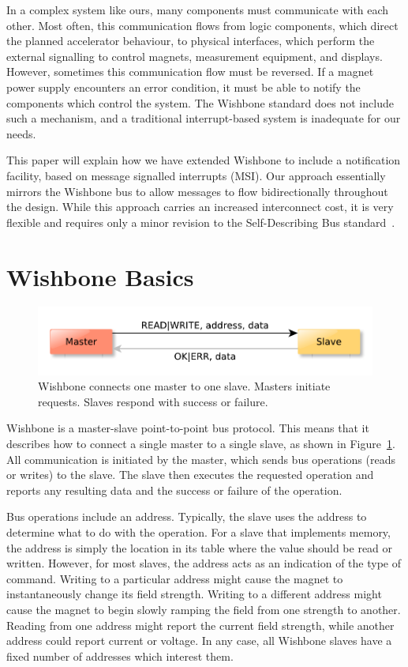 \documentclass[a4paper]{jacow}
\begin{document}
In a complex system like ours, many components must communicate with each other.
Most often, this communication flows from logic components, which direct the
planned accelerator behaviour, to physical interfaces, which perform the
external signalling to control magnets, measurement equipment, and displays.
However, sometimes this communication flow must be reversed.
If a magnet power supply encounters an error condition, 
it must be able to notify the components which control the system.
The Wishbone standard does not include such a mechanism,
and a traditional interrupt-based system is inadequate for our needs.

This paper will explain how we have extended Wishbone to include a
notification facility, based on message signalled interrupts (MSI).
Our approach essentially mirrors the Wishbone bus to allow messages to flow
bidirectionally throughout the design.
While this approach carries an increased interconnect cost, 
it is very flexible and requires only a minor revision to the
Self-Describing Bus standard~\cite{sdb}.

\section{Wishbone Basics}

\begin{figure}[t]
  \centering
  \includegraphics*[width=\columnwidth]{wb-ptp}
  \caption{Wishbone connects one master to one slave. 
  Masters initiate requests. Slaves respond with
  success or failure.}
  \label{fig:wb-ptp}
\end{figure}

Wishbone is a master-slave point-to-point bus protocol.
This means that it describes how to connect a single master to a single slave,
as shown in Figure~\ref{fig:wb-ptp}.
All communication is initiated by the master,
which sends bus operations (reads or writes) to the slave.
The slave then executes the requested operation and reports any resulting
data and the success or failure of the operation.

Bus operations include an address.
Typically, the slave uses the address to determine what to do with the operation.
For a slave that implements memory, the address is simply the location in
its table where the value should be read or written.
However, for most slaves, the address acts as an indication of the type of command.
Writing to a particular address might cause the magnet to instantaneously
change its field strength.
Writing to a different address might cause the magnet to begin slowly ramping 
the field from one strength to another.
Reading from one address might report the current field strength,
while another address could report current or voltage.
In any case,
all Wishbone slaves have a fixed number of addresses which interest them.
\end{document}
